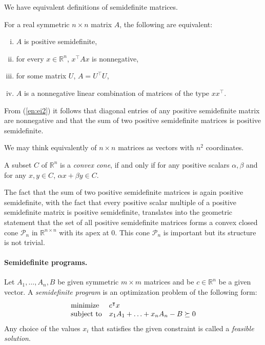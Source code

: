 We have equivalent definitions of semidefinite matrices.
\begin{theorem}
  For a real symmetric $n \times n$ matrix $A$, the following are equivalent:
  \begin{enumerate}[(i)]
    \item $A$ is positive semidefinite,
    \item \label{en:ei2} for every $x \in \mathbb{R}^n$, $x^\intercal Ax$ is nonnegative,
    \item for some matrix $U$, $A = U^\intercal U$,
    \item $A$ is a nonnegative linear combination of matrices of the type $xx^\intercal$.
  \end{enumerate}
\end{theorem}

From (\ref{en:ei2}) it follows that diagonal entries of any positive semidefinite matrix are nonnegative and that the sum of two positive semidefinite matrices is positive semidefinite.

We may think equivalently of $n \times n$ matrices as vectors with $n^2$ coordinates.
\begin{defn}
  A subset $C$ of $\mathbb{R}^n$ is a \emph{convex cone}, if and only if for any positive scalars $\alpha, \beta$ and for any $x, y \in C$, $\alpha x + \beta y \in C$.
\end{defn}

The fact that the sum of two positive semidefinite matrices is again positive semidefinite, with the fact that every positive scalar multiple of a positive semidefinite matrix is positive semidefinite, translates into the geometric statement that the set of all positive semidefinite matrices forms a convex closed cone $\mathcal{P}_n$ in $\mathbb{R}^{n \times n}$ with its apex at 0. This cone $\mathcal{P}_n$ is important but its structure is not trivial.

\paragraph{Semidefinite programs.}

\begin{defn}
  Let $A_1, \ldots, A_n, B$ be given symmetric $m \times m$ matrices and be $c \in \mathbb{R}^n$ be a given vector. A \emph{semidefinite program} is an optimization problem of the following form:
  \begin{equation*}
    \begin{array}{ll@{}ll}
      \text{minimize}   & c^\intercal x                          & \\
      \text{subject to} & x_1A_1 + \ldots + x_nA_n - B \succeq 0   \\
    \end{array}
  \end{equation*}
  Any choice of the values $x_i$ that satisfies the given constraint is called a \emph{feasible solution}.
\end{defn}


